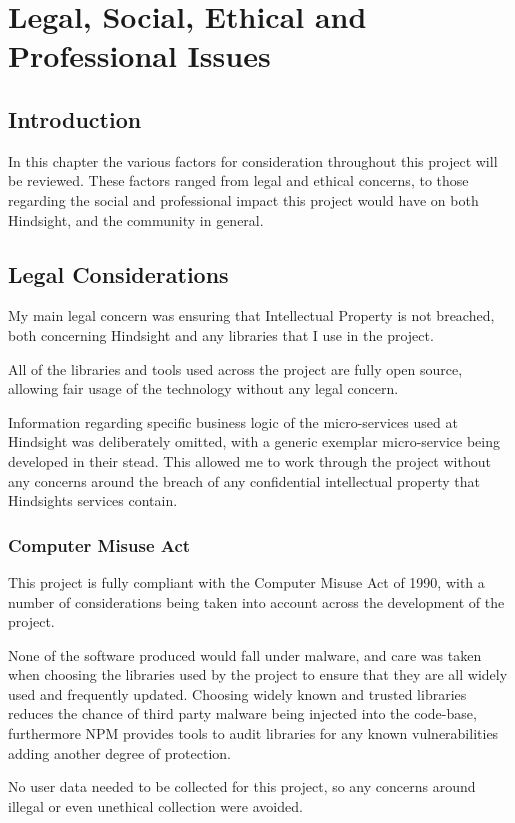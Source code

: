 \chapter{Legal, Social, Ethical and Professional Issues}
\section{Introduction}
In this chapter the various factors for consideration throughout this project will be reviewed. These factors ranged from legal and ethical concerns, to those regarding the social and professional impact this project would have on both Hindsight, and the community in general.

\section{Legal Considerations}
My main legal concern was ensuring that Intellectual Property is not breached, both concerning Hindsight and any libraries that I use in the project.

All of the libraries and tools used across the project are fully open source, allowing fair usage of the technology without any legal concern.

Information regarding specific business logic of the micro-services used at Hindsight was deliberately omitted, with a generic exemplar micro-service being developed in their stead. This allowed me to work through the project without any concerns around the breach of any confidential intellectual property that Hindsights services contain.

\subsection{Computer Misuse Act}
This project is fully compliant with the Computer Misuse Act of 1990, with a number of considerations being taken into account across the development of the project.

None of the software produced would fall under malware, and care was taken when choosing the libraries used by the project to ensure that they are all widely used and frequently updated. Choosing widely known and trusted libraries reduces the chance of third party malware being injected into the code-base, furthermore NPM provides tools to audit libraries for any known vulnerabilities adding another degree of protection.

No user data needed to be collected for this project, so any concerns around illegal or even unethical collection were avoided.

